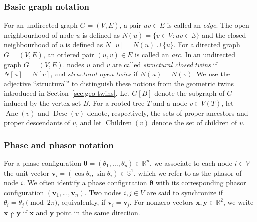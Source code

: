 \documentclass[11pt,reqno]{amsart}
\theoremstyle{definition}
\begin{document}
\subsubsection{Basic graph notation}
For an undirected graph $G=(V,E)$, a pair $uv\in E$ is called an \emph{edge}. The open neighbourhood of node $u$ is defined as $N(u)=\{v\in V: uv\in E\}$ and the closed neighbourhood of $u$ is defined as
$N[u]=N(u)\cup\{u\}$.
For a directed graph $G=(V,E)$, an ordered pair
$(u,v)\in E$ is called an \emph{arc}.
In an undirected graph $G=(V,E)$, nodes $u$ and $v$ are called \emph{structural closed twins} if $N[u]=N[v]$, and \emph{structural open twins} if $N(u)=N(v)$.
We use the adjective ``structural'' to distinguish these notions from the geometric twins introduced in Section~\ref{sec:geo-twins}. Let $G[B]$ denote the subgraph of $G$ induced by the vertex set $B$.
For a rooted tree $T$ and a node $v\in V(T)$, let $\operatorname{Anc}(v)$ and $\operatorname{Desc}(v)$ denote, respectively, the sets of proper ancestors and proper descendants of $v$, and let $\operatorname{Children}(v)$ denote the set of children of $v$.

\subsubsection{Phase and phasor notation}
For a phase configuration $\boldsymbol\theta = (\theta_1,\ldots,\theta_n) \in \mathbb{R}^n$, we associate to each node $i \in V$ the unit vector $\boldsymbol v_i = (\cos \theta_i, \sin \theta_i) \in \mathbb{S}^1$, which we refer to as the phasor of node $i$. We often identify a phase configuration $\boldsymbol\theta$ with its corresponding phasor configuration $(\boldsymbol v_1,\ldots,\boldsymbol v_n)$. Two nodes $i,j \in V$ are said to synchronize if $\theta_i = \theta_j \pmod{2\pi}$, equivalently, if $\boldsymbol v_i = \boldsymbol v_j$.
For nonzero vectors $\boldsymbol x,\boldsymbol y\in\mathbb{R}^2$, we write $\boldsymbol x \Uparrow \boldsymbol y$ if $\boldsymbol x$ and $\boldsymbol y$ point in the same direction.

\end{document}
